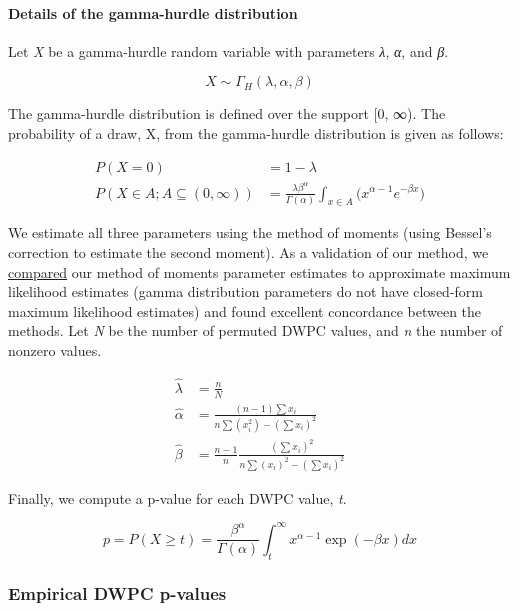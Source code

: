 \hypertarget{details-of-the-gamma-hurdle-distribution}{%
\paragraph{Details of the gamma-hurdle distribution}\label{details-of-the-gamma-hurdle-distribution}}

Let \emph{X} be a gamma-hurdle random variable with parameters \emph{λ}, \emph{α}, and \emph{β}.

\[
X \sim \Gamma_H(\lambda, \alpha, \beta)
\]

The gamma-hurdle distribution is defined over the support {[}0, ∞).
The probability of a draw, X, from the gamma-hurdle distribution is given as follows:

\begin{align}
  P(X = 0) &= 1 - \lambda \\
  P(X \in A; A \subseteq (0, \infty)) &= \frac{\lambda \beta^\alpha}{\Gamma(\alpha)}  \int  _{x \in A} \bigg( x^{\alpha - 1} e^{-\beta x} \bigg)
\end{align}

We estimate all three parameters using the method of moments (using Bessel's correction to estimate the second moment).
As a validation of our method,
we \href{https://github.com/greenelab/connectivity-search-analyses/blob/1c6827ce2544c17cef42bbccf098a312f2c44f97/explore/gamma-hurdle/parameter_estimates.ipynb}{compared} our method of moments parameter estimates to approximate maximum likelihood estimates
(gamma distribution parameters do not have closed-form maximum likelihood estimates)
and found excellent concordance between the methods.
Let \emph{N} be the number of permuted DWPC values, and \emph{n} the number of nonzero values.

\begin{align}
  \hat{\lambda} &= \frac{n}{N} \\
  \hat{\alpha} &= \frac{(n - 1) \sum x_i}{n \sum (x_i^2) - (\sum x_i)^2} \\
  \hat{\beta} &= \frac{n - 1}{n} \frac{(\sum x_i)^2}{n \sum (x_i)^2 - (\sum x_i)^2}
\end{align}

Finally, we compute a p-value for each DWPC value, \emph{t}.

\[
p = P(X ≥ t) = \frac{\beta^\alpha}{\Gamma(\alpha)} \int_t^\infty x^{\alpha - 1} \exp(-\beta x) dx
\]

\hypertarget{empirical-dwpc-p-values}{%
\subsubsection{Empirical DWPC p-values}\label{empirical-dwpc-p-values}}

